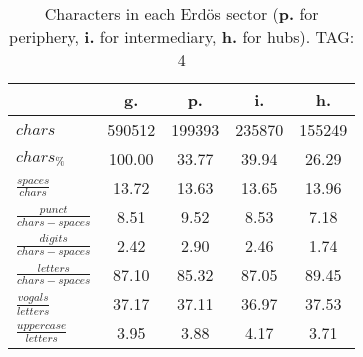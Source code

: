 \begin{table}[h!]
\begin{center}
\begin{tabular}{| l || c | c | c | c |}\hline
 & {\bf g.} & {\bf p.} & {\bf i.} & {\bf h.} \\\hline\hline
$chars$ & 590512  & 199393  & 235870  & 155249 \\
$chars_{\%}$ & 100.00  & 33.77  & 39.94  & 26.29 \\\hline
$\frac{spaces}{chars}$ & 13.72  & 13.63  & 13.65  & 13.96 \\
$\frac{punct}{chars-spaces}$ & 8.51  & 9.52  & 8.53  & 7.18 \\
$\frac{digits}{chars-spaces}$ & 2.42  & 2.90  & 2.46  & 1.74 \\\hline
$\frac{letters}{chars-spaces}$ & 87.10  & 85.32  & 87.05  & 89.45 \\
$\frac{vogals}{letters}$ & 37.17  & 37.11  & 36.97  & 37.53 \\
$\frac{uppercase}{letters}$ & 3.95  & 3.88  & 4.17  & 3.71 \\\hline
\end{tabular}
\caption{Characters in each Erd\"os sector ({{\bf p.}} for periphery, {{\bf i.}} for intermediary, 
    {{\bf h.}} for hubs). TAG: 4}
\end{center}
\end{table}